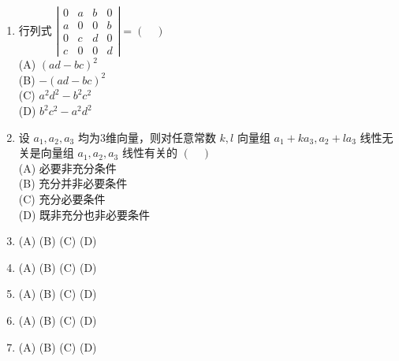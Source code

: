 \begin{enumerate}
\item 行列式 $ \left|\begin{array}{llll}0 & a & b & 0 \\ a & 0 & 0 & b \\ 0 & c & d & 0 \\ c & 0 & 0 & d\end{array}\right|=(\quad)$\\
(A) $(ad-bc)^2$\\
(B) $-(ad-bc)^2$\\
(C) $a^2d^2-b^2c^2$\\
(D) $b^2c^2-a^2d^2$
\item 设 $a_1,a_2,a_3$ 均为3维向量，则对任意常数 $k,l$ 向量组 $a_1+ka_3,a_2+la_3$ 线性无关是向量组 $a_1,a_2,a_3$ 线性有关的 $(\quad)$\\
(A) 必要非充分条件\\
(B) 充分并非必要条件\\
(C) 充分必要条件\\
(D) 既非充分也非必要条件
\item 
(A)
(B)
(C)
(D)
\item 
(A)
(B)
(C)
(D)
\item 
(A)
(B)
(C)
(D)
\item 
(A)
(B)
(C)
(D)
\item 
(A)
(B)
(C)
(D)
\end{enumerate}